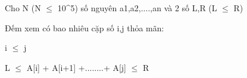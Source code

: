Cho N (N $\le$ 10^5) số nguyên a1,a2,....,an và 2 số L,R (L $\le$ R)    






    Đếm xem có bao nhiêu cặp số i,j thỏa mãn:   



    i  $\le$  j   



    L $\le$  A[i] + A[i+1] +........+ A[j]  $\le$ R